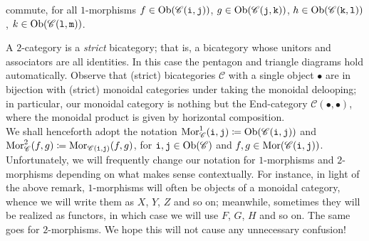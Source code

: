\begin{definition}
\begin{center}
\end{center}
\noindent commute, for all $1$-morphisms $f \in \textup{Ob}(\mathscr{C}(\textup{\texttt{i}}, \textup{\texttt{j}}))$, $g \in \textup{Ob}(\mathscr{C}(\textup{\texttt{j}}, \textup{\texttt{k}}))$, $h \in \textup{Ob}(\mathscr{C}(\textup{\texttt{k}}, \textup{\texttt{l}}))$, $k \in \textup{Ob}(\mathscr{C}(\textup{\texttt{l}}, \textup{\texttt{m}}))$.
\end{definition}
\newpage

\noindent A $2$-category is a {\em strict} bicategory; that is, a bicategory whose unitors and associators are all identities. In this case the pentagon and triangle diagrams hold automatically. Observe that (strict) bicategories $\mathscr{C}$ with a single object $\bullet$ are in bijection with (strict) monoidal categories under taking the monoidal delooping; in particular, our monoidal category is nothing but the End-category $\mathscr{C}(\bullet, \bullet)$, where the monoidal product is given by horizontal composition.\\

\noindent We shall henceforth adopt the notation $\textup{Mor}_\mathscr{C}^1(\textup{\texttt{i}}, \textup{\texttt{j}}) \coloneqq \textup{Ob}(\mathscr{C}(\textup{\texttt{i}}, \textup{\texttt{j}}))$ and $\textup{Mor}_\mathscr{C}^2(f, g) \coloneqq \textup{Mor}_{\mathscr{C}(\textup{\texttt{i}}, \textup{\texttt{j}})}(f, g)$, for $\textup{\texttt{i}}, \textup{\texttt{j}} \in \textup{Ob}(\mathscr{C})$ and $f, g \in \textup{Mor}(\mathscr{C}(\textup{\texttt{i}}, \textup{\texttt{j}}))$. Unfortunately, we will frequently change our notation for $1$-morphisms and $2$-morphisms depending on what makes sense contextually. For instance, in light of the above remark, $1$-morphisms will often be objects of a monoidal category, whence we will write them as $X$, $Y$, $Z$ and so on; meanwhile, sometimes they will be realized as functors, in which case we will use $F$, $G$, $H$ and so on. The same goes for $2$-morphisms. We hope this will not cause any unnecessary confusion!\\

